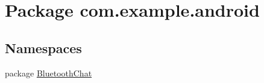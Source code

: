 \hypertarget{namespacecom_1_1example_1_1android}{\section{Package com.\-example.\-android}
\label{namespacecom_1_1example_1_1android}
}
\subsection*{Namespaces}
\begin{DoxyCompactItemize}
\item 
package \hyperlink{namespacecom_1_1example_1_1android_1_1_bluetooth_chat}{Bluetooth\-Chat}
\end{DoxyCompactItemize}
